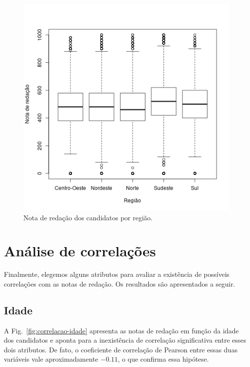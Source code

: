 \documentclass[12pt]{article}
\newcommand{\reffig}[1]{Fig.~\ref{fig:#1}}
\begin{document}
\begin{minipage}{.5\textwidth}
    \begin{figure}[H]
    \includegraphics[width=\linewidth]{../regiao_nota.png}
    \caption{Nota de redação dos candidatos por região.}
    \label{fig:nota-por-regiao}
    \end{figure}
\end{minipage}

\section{Análise de correlações}
Finalmente, elegemos alguns atributos para avaliar a existência de possíveis correlações com as notas de redação.
Os resultados são apresentados a seguir.

\subsection{Idade}
A \reffig{correlacao-idade} apresenta as notas de redação em função da idade dos candidatos e aponta para a inexistência de correlação significativa entre esses dois atributos.
De fato, o coeficiente de correlação de Pearson entre essas duas variáveis vale aproximadamente $-0.11$, o que confirma essa hipótese.
\end{document}
